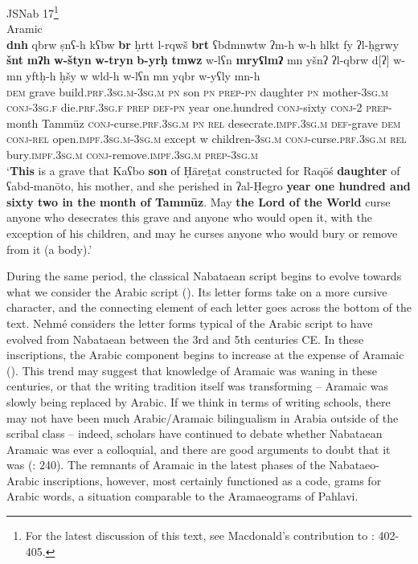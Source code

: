 \documentclass[output=paper]{langsci/langscibook}
\begin{document}
\ea JSNab 17\footnote{For the latest discussion of this text, see Macdonald’s contribution to \citep{fiemaetal2015}: 402-405.}\\ 
Aramic\\
\gll   \textbf{dnh} qbrw ṣnʕ-h kʕbw \textbf{br} ḥrtt l-rqwš \textbf{brt} ʕbdmnwtw ʔm-h w-h hlkt fy ʔl-ḥgrwy \textbf{šnt} \textbf{mʔh} \textbf{w-štyn} \textbf{w-tryn} \textbf{b-yrḥ} \textbf{tmwz} w-lʕn \textbf{mryʕlmʔ} mn yšnʔ ʔl-qbrw d[ʔ] 	w-mn 		yftḥ-h ḥšy w wld-h w-lʕn mn yqbr w-{y}ʕly mn-h \\
       \textsc{dem} grave build.\textsc{prf.3sg.m-3sg.m} \textsc{pn} son \textsc{pn} \textsc{prep-pn} daughter \textsc{pn} mother-\textsc{3sg.m} \textsc{conj-3sg.f} die.\textsc{prf.3sg.f} \textsc{prep} \textsc{def-pn} year one.hundred \textsc{conj}-sixty \textsc{conj-2} \textsc{prep}-month Tammūz \textsc{conj}-curse.\textsc{prf.3sg.m} \textsc{pn} \textsc{rel} desecrate.\textsc{impf.3sg.m} \textsc{def}-grave \textsc{dem} \textsc{conj-rel} open.\textsc{impf.3sg.m-3sg.m} except w children-\textsc{3sg.m} \textsc{conj}-curse.\textsc{prf.3sg.m} \textsc{rel} bury.\textsc{impf.3sg.m} \textsc{conj}-remove.\textsc{impf.3sg.m} \textsc{prep-3sg.m} \\
\glt   `\textbf{This} is a grave that Kaʕbo \textbf{son} of Ḥāreṯat constructed for Raqōś \textbf{daughter} of ʕabd-manōto, his mother, and she perished in ʔal-Ḥegro \textbf{year one hundred and sixty two in the month of Tammūz}. May \textbf{the Lord of the World}  curse anyone who desecrates this grave and anyone who would open it, with the exception of his children, and may he curses anyone who would bury or remove from it (a body).'\\
\z

During the same period, the classical Nabataean script begins to evolve towards what we consider the Arabic script (\citet{Nehmé2010}). Its letter forms take on a more cursive character, and the connecting element of each letter goes across the bottom of the text. Nehmé considers the letter forms typical of the Arabic script to have evolved from Nabataean between the 3rd and 5th centuries CE. In these inscriptions, the Arabic component begins to increase at the expense of Aramaic (\citet{Nehmé2017}). This trend may suggest that knowledge of Aramaic was waning in these centuries, or that the writing tradition itself was transforming – Aramaic was slowly being replaced by Arabic. If we think in terms of writing schools, there may not have been much Arabic/Aramaic bilingualism in Arabia outside of the scribal class – indeed, scholars have continued to debate whether Nabataean Aramaic was ever a colloquial, and there are good arguments to doubt that it was (\citet{Gzella2015}: 240). The remnants of Aramaic in the latest phases of the Nabataeo-Arabic inscriptions, however, most certainly functioned as a code, grams for Arabic words, a situation comparable to the Aramaeograms of Pahlavi.
\end{document}
